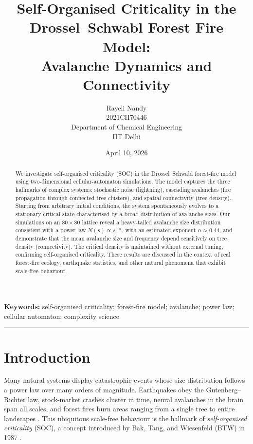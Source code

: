 \documentclass[12pt,a4paper]{article}
\title{\textbf{Self-Organised Criticality in the\\
               Drossel--Schwabl Forest Fire Model:\\
               Avalanche Dynamics and Connectivity}}
\author{Rayeli Nandy \\
 \small 2021CH70446\\
  \small Department of Chemical Engineering\\
  \small IIT Delhi
}
\date{April 10, 2026}
\begin{document}
\maketitle

\begin{abstract}
\noindent
We investigate self-organised criticality (SOC) in the Drossel--Schwabl
forest-fire model using two-dimensional cellular-automaton simulations.
The model captures the three hallmarks of complex systems: stochastic noise
(lightning), cascading avalanches (fire propagation through connected tree
clusters), and spatial connectivity (tree density).
Starting from arbitrary initial conditions, the system spontaneously evolves
to a stationary critical state characterised by a broad distribution of
avalanche sizes.
Our simulations on an $80\times80$ lattice reveal a heavy-tailed avalanche
size distribution consistent with a power law $N(s)\propto s^{-\alpha}$,
with an estimated exponent $\alpha\approx0.44$, and demonstrate that
the mean avalanche size and frequency depend sensitively on tree density
(connectivity).
The critical density is maintained without external tuning, confirming
self-organised criticality.
These results are discussed in the context of real forest-fire ecology,
earthquake statistics, and other natural phenomena that exhibit scale-free
behaviour.
\end{abstract}

\textbf{Keywords:} self-organised criticality; forest-fire model;
avalanche; power law; cellular automaton; complexity science

\vspace{1em}
\hrule
\vspace{1.5em}

\clearpage
\section{Introduction}

Many natural systems display catastrophic events whose size distribution
follows a power law over many orders of magnitude.
Earthquakes obey the Gutenberg--Richter law, stock-market crashes cluster in
time, neural avalanches in the brain span all scales, and forest fires burn
areas ranging from a single tree to entire landscapes \cite{Bak1987,Jensen1998}.
This ubiquitous scale-free behaviour is the hallmark of \emph{self-organised
criticality} (SOC), a concept introduced by Bak, Tang, and Wiesenfeld (BTW)
in 1987 \cite{Bak1987}.
\end{document}
